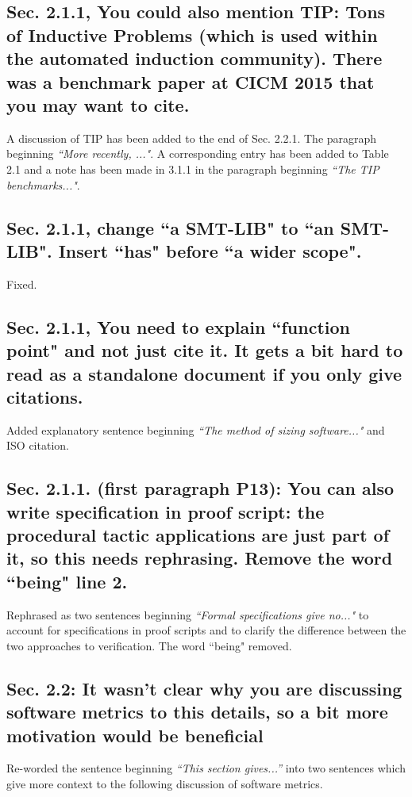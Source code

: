 \documentclass[]{article}
\begin{document}
\subsection{Sec. 2.1.1, You could also mention TIP: Tons of Inductive Problems (which is used within the automated induction community). There was a benchmark paper at CICM 2015 that you may want to cite.}

A discussion of TIP has been added to the end of Sec. 2.2.1. The paragraph beginning \emph{``More recently, ..."}. A corresponding entry has been added to Table 2.1 and a note has been made in 3.1.1 in the paragraph beginning \emph{``The TIP benchmarks..."}.

\subsection{Sec. 2.1.1, change ``a SMT-LIB" to ``an SMT-LIB". Insert ``has" before ``a wider scope".}

Fixed.

\subsection{Sec. 2.1.1, You need to explain ``function point" and not just cite it. It gets a bit hard to read as a standalone document if you only give citations.}

Added explanatory sentence beginning \emph{``The method of sizing software..."} and ISO citation. 

\subsection{Sec. 2.1.1. (first paragraph P13): You can also write specification in proof script: the procedural tactic applications are just part of it, so this needs rephrasing. Remove the word ``being" line 2.} 

Rephrased as two sentences beginning \emph{``Formal specifications give no..."} to account for specifications in proof scripts and to clarify the difference between the two approaches to verification.
The word ``being" removed.
	
\subsection{Sec. 2.2: It wasn't clear why you are discussing software metrics to this details, so a bit more motivation would be beneficial}

Re-worded the sentence beginning \emph{``This section gives...''} into two sentences which give more context to the following discussion of software metrics. 
\end{document}
